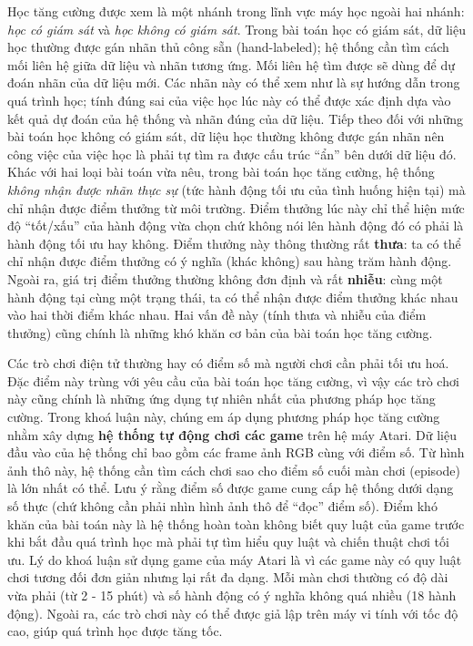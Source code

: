 Học tăng cường được xem là một nhánh trong lĩnh vực máy học ngoài hai nhánh: \textit{học có giám sát} và \textit{học không có giám sát}. 
Trong bài toán học có giám sát, dữ liệu học thường được gán nhãn thủ công sẵn (hand-labeled); hệ thống cần tìm cách mối liên hệ giữa dữ liệu và nhãn tương ứng.
Mối liên hệ tìm được sẽ dùng để dự đoán nhãn của dữ liệu mới.
Các nhãn này có thể xem như là sự hướng dẫn trong quá trình học; tính đúng sai của việc học lúc này có thể được xác định dựa vào kết quả dự đoán của hệ thống và nhãn đúng của dữ liệu. 
Tiếp theo đối với những bài toán học không có giám sát, dữ liệu học thường không được gán nhãn nên công việc của việc học là phải tự tìm ra được cấu trúc ``ẩn'' bên dưới dữ liệu đó. 
Khác với hai loại bài toán vừa nêu, trong bài toán học tăng cường, hệ thống \textit{không nhận được nhãn thực sự} (tức hành động tối ưu của tình huống hiện tại) mà chỉ nhận được điểm thưởng từ môi trường. 
Điểm thưởng lúc này chỉ thể hiện mức độ ``tốt/xấu'' của hành động vừa chọn chứ không nói lên hành động đó có phải là hành động tối ưu hay không. 
Điểm thưởng này thông thường rất \textbf{thưa}: ta có thể chỉ nhận được điểm thưởng có ý nghĩa (khác không) sau hàng trăm hành động. 
Ngoài ra, giá trị điểm thưởng thường không đơn định và rất \textbf{nhiễu}: cùng một hành động tại cùng một trạng thái, ta có thể nhận được điểm thưởng khác nhau vào hai thời điểm khác nhau. 
Hai vấn đề này (tính thưa và nhiễu của điểm thưởng) cũng chính là những khó khăn cơ bản của bài toán học tăng cường.

Các trò chơi điện tử thường hay có điểm số mà người chơi cần phải tối ưu hoá. 
Đặc điểm này trùng với yêu cầu của bài toán học tăng cường, vì vậy các trò chơi này cũng chính là những ứng dụng tự nhiên nhất của phương pháp học tăng cường. 
Trong khoá luận này, chúng em áp dụng phương pháp học tăng cường nhằm xây dựng \textbf{hệ thống tự động chơi các game} trên hệ máy Atari. 
Dữ liệu đầu vào của hệ thống chỉ bao gồm các frame ảnh RGB cùng với điểm số. 
Từ hình ảnh thô này, hệ thống cần tìm cách chơi sao cho điểm số cuối màn chơi (episode) là lớn nhất có thể.
Lưu ý rằng điểm số được game cung cấp hệ thống dưới dạng số thực (chứ không cần phải nhìn hình ảnh thô để ``đọc'' điểm số).
Điểm khó khăn của bài toán này là hệ thống hoàn toàn không biết quy luật của game trước khi bắt đầu quá trình học mà phải tự tìm hiểu quy luật và chiến thuật chơi tối ưu. 
Lý do khoá luận sử dụng game của máy Atari là vì các game này có quy luật chơi tương đối đơn giản nhưng lại rất đa dạng. 
Mỗi màn chơi thường có độ dài vừa phải (từ 2 - 15 phút) và số hành động có ý nghĩa không quá nhiều (18 hành động). 
Ngoài ra, các trò chơi này có thể được giả lập trên máy vi tính với tốc độ cao, giúp quá trình học được tăng tốc.

